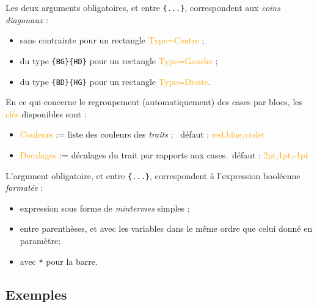 \documentclass[french,a4paper,11pt]{article}
\newcommand\Cle[1]{{\small\sffamily\textlangle \textcolor{orange}{#1}\textrangle}}
\begin{document}
{{\begin{tipblock}
Les deux arguments obligatoires, et entre \texttt{\{...\}}, correspondent aux \textit{coins diagonaux} :

\begin{itemize}
	\item sans contrainte pour un rectangle \Cle{Type=Centre} ;
	\item du type \texttt{\{BG\}\{HD\}} pour un rectangle \Cle{Type=Gauche} ;
	\item du type \texttt{\{BD\}\{HG\}} pour un rectangle \Cle{Type=Droite}.
\end{itemize}
\vspace*{-\baselineskip}\leavevmode
\end{tipblock}

\begin{tipblock}
En ce qui concerne le regroupement (automatiquement) des cases par blocs, les \Cle{clés} disponibles sont :

\begin{itemize}
	\item \Cle{Couleurs} := liste des couleurs des \textit{traits} ; \hfill~défaut : \Cle{red,blue,violet}
	\item \Cle{Decalages} := décalages du trait par rapports aux cases.\hfill~défaut : \Cle{2pt,1pt,-1pt}
\end{itemize}

L'argument obligatoire, et entre \texttt{\{...\}}, correspondent à l'expression booléenne \textit{formatée} :

\begin{itemize}
	\item expression sous forme de \textit{mintermes} simples ;
	\item entre parenthèses, et avec les variables dans le même ordre que celui donné en paramètre;
	\item avec \texttt{*} pour la barre.
\end{itemize}
\vspace*{-\baselineskip}\leavevmode
\end{tipblock}

\subsection{Exemples}

}}
\end{document}
